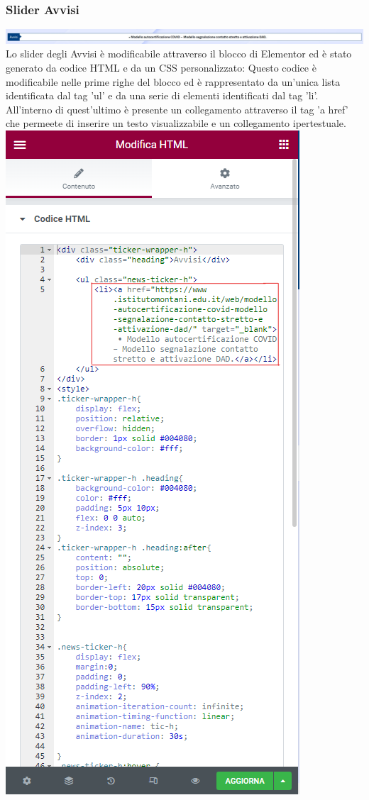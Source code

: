 \documentclass{article}
\begin{document}
		\subsubsection{\textbf{Slider Avvisi}}
			\includegraphics[scale=0.19]{Slider Avvisi.jpeg}\\
			Lo slider degli Avvisi è modificabile attraverso il blocco di Elementor ed è stato generato da codice HTML e da un CSS personalizzato:
			Questo codice è modificabile nelle prime righe del blocco ed è rappresentato da un'unica lista identificata dal tag 'ul' e da una serie di elementi identificati dal tag 'li'. All'interno di quest'ultimo è presente un collegamento attraverso il tag 'a href' che permeete di inserire un testo visualizzabile e un collegamento ipertestuale.\\
			
			\vspace{0.2 cm}
			\includegraphics[scale=0.28]{Modifica Slider Avvisi.png}\\
\end{document}
